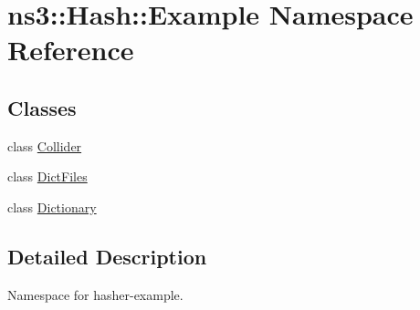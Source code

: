 \hypertarget{namespacens3_1_1Hash_1_1Example}{}\section{ns3\+:\+:Hash\+:\+:Example Namespace Reference}
\label{namespacens3_1_1Hash_1_1Example}
\subsection*{Classes}
\begin{DoxyCompactItemize}
\item 
class \hyperlink{classns3_1_1Hash_1_1Example_1_1Collider}{Collider}
\item 
class \hyperlink{classns3_1_1Hash_1_1Example_1_1DictFiles}{Dict\+Files}
\item 
class \hyperlink{classns3_1_1Hash_1_1Example_1_1Dictionary}{Dictionary}
\end{DoxyCompactItemize}


\subsection{Detailed Description}
Namespace for hasher-\/example. 